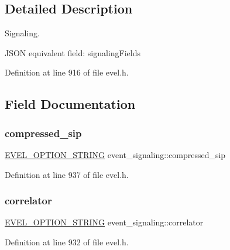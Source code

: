 \subsection{Detailed Description}
Signaling. 

J\+S\+ON equivalent field\+: signaling\+Fields 

Definition at line 916 of file evel.\+h.



\subsection{Field Documentation}
\hypertarget{structevent__signaling_ad1e58e43b9970157b410b4c192237824}{}\label{structevent__signaling_ad1e58e43b9970157b410b4c192237824} 
\subsubsection{\texorpdfstring{compressed\+\_\+sip}{compressed\_sip}}
{\footnotesize\ttfamily \hyperlink{evel_8h_a0de5113a7b72de93c0c7b644f7ea7ec3}{E\+V\+E\+L\+\_\+\+O\+P\+T\+I\+O\+N\+\_\+\+S\+T\+R\+I\+NG} event\+\_\+signaling\+::compressed\+\_\+sip}



Definition at line 937 of file evel.\+h.

\hypertarget{structevent__signaling_a09e069c4e08e64e20bb28f174774a80d}{}\label{structevent__signaling_a09e069c4e08e64e20bb28f174774a80d} 
\subsubsection{\texorpdfstring{correlator}{correlator}}
{\footnotesize\ttfamily \hyperlink{evel_8h_a0de5113a7b72de93c0c7b644f7ea7ec3}{E\+V\+E\+L\+\_\+\+O\+P\+T\+I\+O\+N\+\_\+\+S\+T\+R\+I\+NG} event\+\_\+signaling\+::correlator}



Definition at line 932 of file evel.\+h.

\hypertarget{structevent__signaling_a377b3d5429de73e7bbea25127b02fc2d}{}\label{structevent__signaling_a377b3d5429de73e7bbea25127b02fc2d} 
